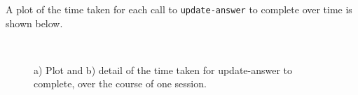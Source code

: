 \documentclass[12pt,twoside,notitlepage,xetex]{report}
\begin{document}
A plot of the time taken for each call to \verb¬update-answer¬ to complete over time is shown below.

\begin{center}
\begin{figure}[H]
\begin{center}
\\
\end{center}
\caption{a) Plot and b) detail of the time taken for {\ttfamily update-answer} to complete, over the course of one session.}
\label{fig:UpdateTimes}
\end{figure}
\end{center}
\end{document}
